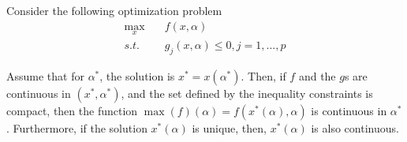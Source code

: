 \documentclass[aspectratio=169]{beamer}
\begin{document}
\begin{frame}
    \begin{theorem}
        Consider the following optimization problem
        \begin{align*}
            \max_x\quad &f(x,\alpha)\\
            s.t.\quad &g_j(x,\alpha)\leq 0,j=1,...,p
        \end{align*}
        
        Assume that for $\alpha^*$, the solution is $x^*=x(\alpha^*)$. Then, if $f$ and the $g$s are continuous in $(x^*,\alpha^*)$, and the set defined by the inequality constraints is compact, then the function $\max(f)(\alpha)=f(x^*(\alpha),\alpha)$ is continuous in $\alpha^*$. Furthermore, if the solution $x^*(\alpha)$ is unique, then, $x^*(\alpha)$ is also continuous.
        
    \end{theorem}
\end{frame}
\end{document}
